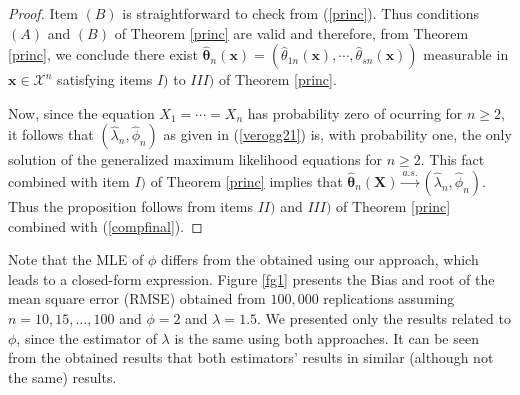 \documentclass[10pt,a4paper,onecolumn]{article} %
\newcommand{\bs}{\boldsymbol}
\begin{document}
\begin{proof}
Item $(B)$ is straightforward to check from (\ref{princ}). Thus conditions $(A)$ and $(B)$ of Theorem \ref{princ} are valid and therefore, from Theorem \ref{princ}, we conclude there exist $\bs{\hat{\theta}}_n(\bs{x})=(\hat{\theta}_{1n}(\bs{x}),\cdots,\hat{\theta}_{sn}(\bs{x}))$ measurable in $\bs{x}\in \mathcal{X}^n$ satisfying items $I)$ to $III)$ of Theorem \ref{princ}.

 Now, since the equation $X_1=\cdots=X_n$ has probability zero of ocurring for $n\geq 2$, it follows that $(\hat\lambda_n,\hat\phi_n)$ as given in (\ref{verogg21}) is, with probability one, the only solution of the generalized maximum likelihood equations for $n\geq 2$.
This fact combined with item $I)$ of Theorem \ref{princ} implies that $\bs{\hat{\theta}}_n(\bs{X})\overset{a.s.}{\to} (\hat\lambda_n,\hat\phi_n)$. Thus the proposition follows from items $II)$ and $III)$ of Theorem \ref{princ}  combined with (\ref{compfinal}).
\end{proof}

Note that the MLE of $\phi$ differs from the obtained using our approach, which leads to a closed-form expression. Figure \ref{fg1} presents the Bias and root of the mean square error (RMSE) obtained from $100,000$ replications assuming $n=10,15,\ldots,100$ and $\phi=2$ and $\lambda=1.5$. We presented only the results related to $\phi$, since the estimator of $\lambda$ is the same using both approaches. It can be seen from the obtained results that both estimators' results in similar (although not the same) results.



\end{document}
